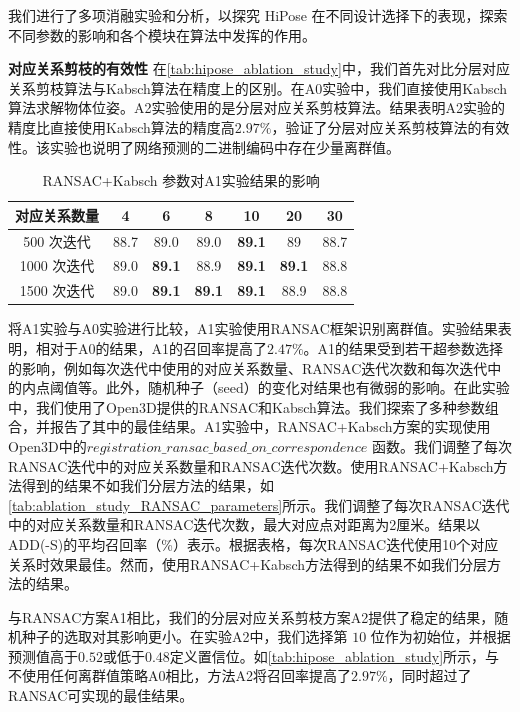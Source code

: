 我们进行了多项消融实验和分析，以探究 HiPose 在不同设计选择下的表现，探索不同参数的影响和各个模块在算法中发挥的作用。



\textbf{对应关系剪枝的有效性 }
在\autoref{tab:hipose_ablation_study}中，我们首先对比分层对应关系剪枝算法与Kabsch算法在精度上的区别。在A0实验中，我们直接使用Kabsch算法求解物体位姿。A2实验使用的是分层对应关系剪枝算法。结果表明A2实验的精度比直接使用Kabsch算法的精度高$2.97\%$，验证了分层对应关系剪枝算法的有效性。该实验也说明了网络预测的二进制编码中存在少量离群值。

\begin{table}
  \centering
  \begin{tabular}{@{}c|c|c|c|c|c|c@{}}
    \toprule
    对应关系数量  & 4 & 6 & 8 & 10 & 20 & 30 \\
     \midrule
     500 次迭代 & 88.7 & 89.0 & 89.0	& \textbf{89.1} & 89 & 88.7 \\
     1000 次迭代 & 89.0 & \textbf{89.1} & 88.9 & \textbf{89.1} & \textbf{89.1} & 88.8 \\
     1500 次迭代 & 89.0 & \textbf{89.1} & \textbf{89.1} & \textbf{89.1} & 88.9 & 88.8 \\
    \bottomrule
  \end{tabular}
  \caption{RANSAC+Kabsch 参数对A1实验结果的影响}
  \label{tab:ablation_study_RANSAC_parameters}
\end{table}

将A1实验与A0实验进行比较，A1实验使用RANSAC框架识别离群值。实验结果表明，相对于A0的结果，A1的召回率提高了$2.47\%$。A1的结果受到若干超参数选择的影响，例如每次迭代中使用的对应关系数量、RANSAC迭代次数和每次迭代中的内点阈值等。此外，随机种子（seed）的变化对结果也有微弱的影响。在此实验中，我们使用了Open3D\cite{zhou2018open3d}提供的RANSAC和Kabsch算法。我们探索了多种参数组合，并报告了其中的最佳结果。A1实验中，RANSAC+Kabsch方案的实现使用Open3D中的$registration\_ransac\_based\_on\_correspondence$ 函数。我们调整了每次RANSAC迭代中的对应关系数量和RANSAC迭代次数。使用RANSAC+Kabsch方法得到的结果不如我们分层方法的结果，如\autoref{tab:ablation_study_RANSAC_parameters}所示。我们调整了每次RANSAC迭代中的对应关系数量和RANSAC迭代次数，最大对应点对距离为2厘米。结果以ADD(-S)的平均召回率（\%）表示。根据表格，每次RANSAC迭代使用10个对应关系时效果最佳。然而，使用RANSAC+Kabsch方法得到的结果不如我们分层方法的结果。

与RANSAC方案A1相比，我们的分层对应关系剪枝方案A2提供了稳定的结果，随机种子的选取对其影响更小。在实验A2中，我们选择第 $10$ 位作为初始位，并根据预测值高于$0.52$或低于$0.48$定义置信位。如\autoref{tab:hipose_ablation_study}所示，与不使用任何离群值策略A0相比，方法A2将召回率提高了$2.97\%$，同时超过了RANSAC可实现的最佳结果。

